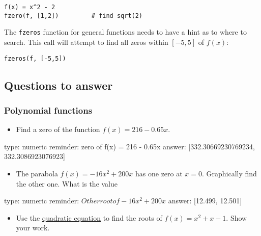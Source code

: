 \documentclass[12pt]{article}
\begin{document}
\begin{verbatim}
f(x) = x^2 - 2
fzero(f, [1,2])         # find sqrt(2)
\end{verbatim}
The \texttt{fzeros} function for general functions needs to have a hint
as to where to search. This call will attempt to find all zeros within
$[-5,5]$ of $f(x)$:



\begin{verbatim}
fzeros(f, [-5,5])
\end{verbatim}
\subsection{Questions to answer}

\subsubsection{Polynomial functions}

\begin{itemize}
\itemsep1pt\parskip0pt
\item
  Find a zero of the function $f(x) = 216 - 0.65x$.
\end{itemize}

\begin{answer}
    type: numeric
    reminder: zero of f(x) = 216 - 0.65x
    answer: [332.30669230769234, 332.3086923076923]

\end{answer}

\begin{itemize}
\itemsep1pt\parskip0pt
\item
  The parabola $f(x) = -16x^2 + 200x$ has one zero at $x=0$. Graphically
  find the other one. What is the value
\end{itemize}

\begin{answer}
    type: numeric
    reminder: \(Other root of -16x^2 + 200x\)
    answer: [12.499, 12.501]

\end{answer}

\begin{itemize}
\itemsep1pt\parskip0pt
\item
  Use the
  \href{http://en.wikipedia.org/wiki/Quadratic_equation}{quadratic
  equation} to find the roots of $f(x) = x^2 + x - 1$. Show your work.
\end{itemize}
\end{document}

